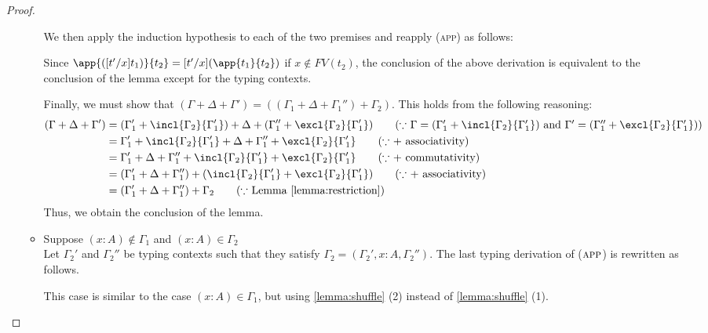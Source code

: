 \begin{proof}
\begin{itemize}
\begin{itemize}
We then apply the induction hypothesis to each of the two premises and reapply (\textsc{app}) as follows:
\begin{center}
    \begin{minipage}{.75\linewidth}
    \end{minipage}
\end{center}
Since $\app{([t'/x]t_1)}{t_2}=[t'/x](\app{t_1}{t_2})$ if $x\notin FV(t_2)$, the conclusion of the above derivation is equivalent to the conclusion of the lemma except for the typing contexts.\par
Finally, we must show that $(\Gamma + \Delta + \Gamma') = ((\Gamma_1 + \Delta + \Gamma_1'') + \Gamma_2)$.
This holds from the following reasoning:
\begin{align*}
(\Gamma + \Delta + \Gamma')
    &= (\Gamma_1' + \incl{\Gamma_2}{\Gamma_1'}) + \Delta + (\Gamma_1'' + \excl{\Gamma_2}{\Gamma_1'})\tag{$\because$ $\Gamma = (\Gamma_1' + \incl{\Gamma_2}{\Gamma_1'})$ and $\Gamma' = (\Gamma_1'' + \excl{\Gamma_2}{\Gamma_1'})$}\\
    &= \Gamma_1' + \incl{\Gamma_2}{\Gamma_1'} + \Delta + \Gamma_1'' + \excl{\Gamma_2}{\Gamma_1'}\tag{$\because$ $+$ associativity}\\
    &= \Gamma_1' + \Delta + \Gamma''_1 + \incl{\Gamma_2}{\Gamma_1'} + \excl{\Gamma_2}{\Gamma_1'}\tag{$\because$ $+$ commutativity}\\
    &= (\Gamma_1' + \Delta + \Gamma''_1) + (\incl{\Gamma_2}{\Gamma_1'} + \excl{\Gamma_2}{\Gamma_1'})\tag{$\because$ $+$ associativity}\\
    &= (\Gamma_1' + \Delta + \Gamma''_1) + \Gamma_2\tag{$\because$ Lemma \ref{lemma:restriction}}
\end{align*}
Thus, we obtain the conclusion of the lemma.

\item Suppose $(x:A) \notin \Gamma_1$ and $(x:A) \in \Gamma_2$\\
Let $\Gamma_2'$ and $\Gamma_2''$ be typing contexts such that they satisfy  $\Gamma_2 = (\Gamma_2', x:A, \Gamma_2'')$.
The last typing derivation of ($\textsc{app}$) is rewritten as follows.
\begin{center}
    \begin{minipage}{.75\linewidth}
    \end{minipage}
\end{center}
This case is similar to the case $(x:A)\in \Gamma_1$, but using \ref{lemma:shuffle} (2) instead of \ref{lemma:shuffle} (1).\\
\end{itemize}



\end{itemize}
\end{proof}
